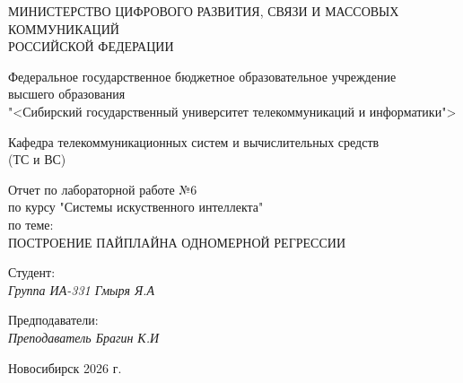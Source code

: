 \thispagestyle{empty}

\begin{center}
    МИНИСТЕРСТВО ЦИФРОВОГО РАЗВИТИЯ, СВЯЗИ И МАССОВЫХ КОММУНИКАЦИЙ \\ РОССИЙСКОЙ ФЕДЕРАЦИИ

    \vspace{20pt}

    Федеральное государственное бюджетное образовательное учреждение  \\  высшего образования \\
    "<Сибирский государственный университет телекоммуникаций и информатики"> \\

    \vspace{20pt}

    Кафедра телекоммуникационных систем и вычислительных средств \\  (ТС и ВС)
\end{center}

\vfill

\begin{center}
    Отчет по лабораторной работе №6 \\  
    по курсу "Системы искуственного интеллекта" \\
    \vspace{20pt}
    по теме: \\
    \uppercase{ ПОСТРОЕНИЕ ПАЙПЛАЙНА
ОДНОМЕРНОЙ РЕГРЕССИИ}
\end{center}

\vfill

    \noindent Студент: \\
    \textit{Группа ИА-331 \hfill Гмыря Я.А} 

    \vspace{20pt}
 
    \noindent Предподаватели: \\
    \textit{Преподаватель \hfill Брагин К.И} \\
\vfill

\begin{center}
    Новосибирск 2026 г.
\end{center}
